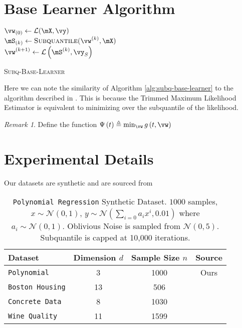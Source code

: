 \documentclass{article} %
\theoremstyle{plain}
\theoremstyle{definition}
\theoremstyle{remark}
\newtheorem{remark}[thm]{Remark}
\newcommand{\ccref}[1]{\textcolor{black}{\cref{#1}}}
\begin{document}
\begin{appendices}
	\section{Base Learner Algorithm}
	\label{app:base-learner}
	\begin{algorithm}[H]
		\DontPrintSemicolon
		$\vw_{(0)} \gets \mathcal{L}(\mX,\vy)$\\
		{
			$\mS_{(k)} \gets \textsc{Subquantile}(\vw^{(k)},\mX)$\Comment{Algorithm \ccref{alg:subquantile}}\\
			$\vw^{(k+1)} \gets \mathcal{L}\left(\mS^{(k)},\vy_S\right)$\\
		}
		\caption{\textsc{Subq-Base-Learner}}
		\label{alg:subq-base-learner}
	\end{algorithm}
	Here we can note the similarity of Algorithm \ccref{alg:subq-base-learner} to the algorithm described in \citep{awasthi:2022}. This is because the Trimmed Maximum Likelihood Estimator is equivalent to minimizing over the subquantile of the likelihood. 
	
	\begin{remark}
		Define the function $\Psi\left(t\right) \triangleq \min_{\vw} g\left(t,\vw\right)$
	\end{remark}
	
	\clearpage
	
	\section{Experimental Details}
	Our datasets are synthetic and are sourced from \citep{Dua2019}
	\begin{table}[!h]
		\centering
		\begin{tabular}{lccc}
			\toprule 
			\textbf{Dataset}&\textbf{Dimension} $d$& \textbf{Sample Size} $n$& \textbf{Source}\\
			\midrule
			\texttt{Polynomial} & 3 & 1000 & Ours \\
			\texttt{Boston Housing} & 13 & 506 & \citep{Dua2019} \\
			\texttt{Concrete Data} & 8 & 1030 & \citep{Dua2019} \\
			\texttt{Wine Quality} & 11 & 1599 & \citep{Dua2019}\\
			\bottomrule
		\end{tabular}
		\caption{\texttt{Polynomial Regression} Synthetic Dataset. $1000$ samples, $x \sim \mathcal{N}(0,1)$, $y \sim \mathcal{N}(\sum_{i=0}a_ix^{i},0.01)$ where $a_i \sim \mathcal{N}(0,1)$. Oblivious Noise is sampled from $\mathcal{N}(0,5)$. Subquantile is capped at 10,000 iterations.}
		\label{tab:dataset-information}
	\end{table}
	

\end{appendices}
\end{document}

